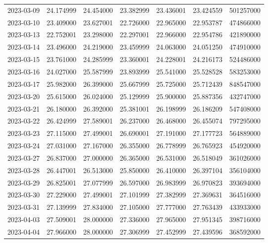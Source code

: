 \begin{tabular}{lrrrrrr}
2023-03-09 &   24.174999 &   24.454000 &   23.382999 &   23.436001 &   23.424559 &   501257000 \\
2023-03-10 &   23.409000 &   23.627001 &   22.726000 &   22.965000 &   22.953787 &   474866000 \\
2023-03-13 &   22.752001 &   23.298000 &   22.297001 &   22.966000 &   22.954786 &   421890000 \\
2023-03-14 &   23.496000 &   24.219000 &   23.459999 &   24.063000 &   24.051250 &   474910000 \\
2023-03-15 &   23.761000 &   24.285999 &   23.360001 &   24.228001 &   24.216173 &   524486000 \\
2023-03-16 &   24.027000 &   25.587999 &   23.893999 &   25.541000 &   25.528528 &   583253000 \\
2023-03-17 &   25.982000 &   26.399000 &   25.667999 &   25.725000 &   25.712439 &   848547000 \\
2023-03-20 &   25.615000 &   26.024000 &   25.129999 &   25.900000 &   25.887356 &   432747000 \\
2023-03-21 &   26.180000 &   26.392000 &   25.381001 &   26.198999 &   26.186209 &   547408000 \\
2023-03-22 &   26.424999 &   27.589001 &   26.237000 &   26.468000 &   26.455074 &   797295000 \\
2023-03-23 &   27.115000 &   27.499001 &   26.690001 &   27.191000 &   27.177723 &   564889000 \\
2023-03-24 &   27.031000 &   27.167000 &   26.355000 &   26.778999 &   26.765923 &   454920000 \\
2023-03-27 &   26.837000 &   27.000000 &   26.365000 &   26.531000 &   26.518049 &   361026000 \\
2023-03-28 &   26.447001 &   26.513000 &   25.850000 &   26.410000 &   26.397104 &   356104000 \\
2023-03-29 &   26.825001 &   27.077999 &   26.597000 &   26.983999 &   26.970823 &   393694000 \\
2023-03-30 &   27.229000 &   27.499001 &   27.101999 &   27.382999 &   27.369631 &   364516000 \\
2023-03-31 &   27.139999 &   27.834000 &   27.105000 &   27.777000 &   27.763439 &   433933000 \\
2023-04-03 &   27.509001 &   28.000000 &   27.336000 &   27.965000 &   27.951345 &   398716000 \\
2023-04-04 &   27.966000 &   28.000000 &   27.306999 &   27.452999 &   27.439596 &   368592000 \\

\end{tabular}

